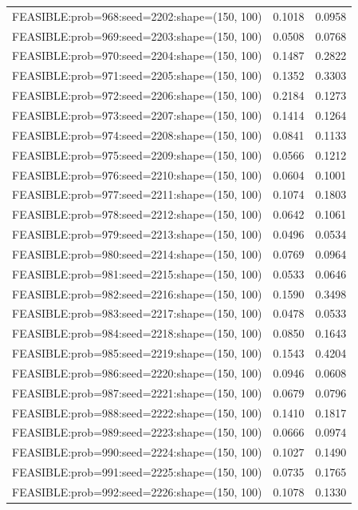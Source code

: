 \begin{longtable}{lcc}
FEASIBLE:prob=968:seed=2202:shape=(150, 100) &   0.1018 & 0.0958 \\
FEASIBLE:prob=969:seed=2203:shape=(150, 100) &   0.0508 & 0.0768 \\
FEASIBLE:prob=970:seed=2204:shape=(150, 100) &   0.1487 & 0.2822 \\
FEASIBLE:prob=971:seed=2205:shape=(150, 100) &   0.1352 & 0.3303 \\
FEASIBLE:prob=972:seed=2206:shape=(150, 100) &   0.2184 & 0.1273 \\
FEASIBLE:prob=973:seed=2207:shape=(150, 100) &   0.1414 & 0.1264 \\
FEASIBLE:prob=974:seed=2208:shape=(150, 100) &   0.0841 & 0.1133 \\
FEASIBLE:prob=975:seed=2209:shape=(150, 100) &   0.0566 & 0.1212 \\
FEASIBLE:prob=976:seed=2210:shape=(150, 100) &   0.0604 & 0.1001 \\
FEASIBLE:prob=977:seed=2211:shape=(150, 100) &   0.1074 & 0.1803 \\
FEASIBLE:prob=978:seed=2212:shape=(150, 100) &   0.0642 & 0.1061 \\
FEASIBLE:prob=979:seed=2213:shape=(150, 100) &   0.0496 & 0.0534 \\
FEASIBLE:prob=980:seed=2214:shape=(150, 100) &   0.0769 & 0.0964 \\
FEASIBLE:prob=981:seed=2215:shape=(150, 100) &   0.0533 & 0.0646 \\
FEASIBLE:prob=982:seed=2216:shape=(150, 100) &   0.1590 & 0.3498 \\
FEASIBLE:prob=983:seed=2217:shape=(150, 100) &   0.0478 & 0.0533 \\
FEASIBLE:prob=984:seed=2218:shape=(150, 100) &   0.0850 & 0.1643 \\
FEASIBLE:prob=985:seed=2219:shape=(150, 100) &   0.1543 & 0.4204 \\
FEASIBLE:prob=986:seed=2220:shape=(150, 100) &   0.0946 & 0.0608 \\
FEASIBLE:prob=987:seed=2221:shape=(150, 100) &   0.0679 & 0.0796 \\
FEASIBLE:prob=988:seed=2222:shape=(150, 100) &   0.1410 & 0.1817 \\
FEASIBLE:prob=989:seed=2223:shape=(150, 100) &   0.0666 & 0.0974 \\
FEASIBLE:prob=990:seed=2224:shape=(150, 100) &   0.1027 & 0.1490 \\
FEASIBLE:prob=991:seed=2225:shape=(150, 100) &   0.0735 & 0.1765 \\
FEASIBLE:prob=992:seed=2226:shape=(150, 100) &   0.1078 & 0.1330 \\

\end{longtable}
